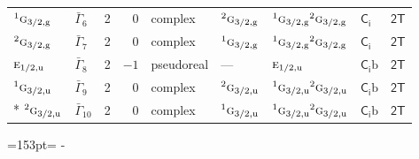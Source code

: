 \documentclass[10pt,a4paper]{article}
\newcommand{\needspace}[1]{\par\penalty-100\begingroup\dimen0=#1\relax\dimen2=\pagegoal
  \advance\dimen2-\pagetotal\ifdim\dimen0>\dimen2\relax\ifdim\dimen2>0pt\vfil\break\fi\fi
  \endgroup}
\numberwithin{equation}{section}
\newcommand{\grp}[1]{\mathsf{#1}}
\newcommand{\irr}[1]{\text{\normalfont\scshape #1}}
\newcommand{\conjpair}[1]{{}^{#1}}
\newcommand{\ptag}[1]{\mathrm{#1}}
\newcommand{\secondclass}{\mathrm{b}}
\begin{document}
{\begin{longtable}{@{}llrrlllll@{}}
$\conjpair{1}\irr{g}_{3/2,\ptag{g}}$ & $\bar{\Gamma}_{6}$ & 2 & $0$ & complex & $\conjpair{2}\irr{g}_{3/2,\ptag{g}}$ & $\conjpair{1}\irr{g}_{3/2,\ptag{g}}\conjpair{2}\irr{g}_{3/2,\ptag{g}}$ & \href{S2.pdf}{$\grp{C_{i}}$} & \href{2T.pdf}{$\grp{2T}$}\\
$\conjpair{2}\irr{g}_{3/2,\ptag{g}}$ & $\bar{\Gamma}_{7}$ & 2 & $0$ & complex & $\conjpair{1}\irr{g}_{3/2,\ptag{g}}$ & $\conjpair{1}\irr{g}_{3/2,\ptag{g}}\conjpair{2}\irr{g}_{3/2,\ptag{g}}$ & \href{S2.pdf}{$\grp{C_{i}}$} & \href{2T.pdf}{$\grp{2T}$}\\
$\irr{e}_{1/2,\ptag{u}}$ & $\bar{\Gamma}_{8}$ & 2 & $-1$ & pseudoreal & --- & $\irr{e}_{1/2,\ptag{u}}$ & \href{S2b.pdf}{$\grp{C_{i}}\secondclass$} & \href{2T.pdf}{$\grp{2T}$}\\
$\conjpair{1}\irr{g}_{3/2,\ptag{u}}$ & $\bar{\Gamma}_{9}$ & 2 & $0$ & complex & $\conjpair{2}\irr{g}_{3/2,\ptag{u}}$ & $\conjpair{1}\irr{g}_{3/2,\ptag{u}}\conjpair{2}\irr{g}_{3/2,\ptag{u}}$ & \href{S2b.pdf}{$\grp{C_{i}}\secondclass$} & \href{2T.pdf}{$\grp{2T}$}\\*
$\conjpair{2}\irr{g}_{3/2,\ptag{u}}$ & $\bar{\Gamma}_{10}$ & 2 & $0$ & complex & $\conjpair{1}\irr{g}_{3/2,\ptag{u}}$ & $\conjpair{1}\irr{g}_{3/2,\ptag{u}}\conjpair{2}\irr{g}_{3/2,\ptag{u}}$ & \href{S2b.pdf}{$\grp{C_{i}}\secondclass$} & \href{2T.pdf}{$\grp{2T}$}\\
\bottomrule\end{longtable}}
\needspace{153pt}
\end{document}
